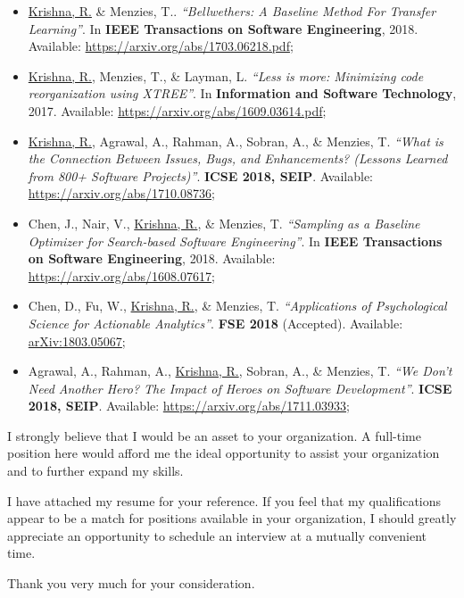 \documentclass[10pt,letterpaper,sans]{moderncv}         \moderncvstyle{casual}
\begin{document}
\begin{itemize}
    \item\small \underline{Krishna, R.} \& Menzies, T.. \textit{``Bellwethers: 
    A Baseline Method For Transfer Learning''}. In\textbf{ IEEE Transactions on 
    Software Engineering}, 2018. Available: \href{https://arxiv.org/abs/1703.06218.pdf}{https://arxiv.org/abs/1703.06218.pdf};\\[0.2cm]
    
    \item\small \underline{Krishna, R.}, Menzies, T., \& Layman, L. 
    \textit{``Less is more: Minimizing code reorganization using XTREE''}. In 
    \textbf{Information and Software Technology}, 2017. Available: \href{https://arxiv.org/abs/1609.03614.pdf}{https://arxiv.org/abs/1609.03614.pdf};\\[0.2cm]
    
    \item\small \underline{Krishna, R.}, Agrawal, A., Rahman, A., Sobran, A., 
    \& Menzies, T. \textit{``What is the Connection Between Issues, Bugs, and 
    Enhancements? (Lessons Learned from 800+ Software Projects)''}. 
    \textbf{ICSE 2018, SEIP}. Available: \href{https://arxiv.org/abs/1710.08736}{https://arxiv.org/abs/1710.08736};\\[0.2cm]
    
    \item\small Chen, J., Nair, V., \underline{Krishna, R.}, \& Menzies, T. 
    \textit{``Sampling as a Baseline Optimizer for Search-based Software
    Engineering''}. In \textbf{IEEE Transactions on Software Engineering}, 2018. Available: \href{https://arxiv.org/abs/1608.07617}{https://arxiv.org/abs/1608.07617};\\[0.2cm]

    \item\small Chen, D., Fu, W., \underline{Krishna, R.}, \& Menzies, T. \textit{``Applications of Psychological Science for Actionable Analytics''}. \textbf{FSE 2018} (Accepted). Available: \href{https://arxiv.org/abs/1803.05067}{arXiv:1803.05067};\\[0.2cm]

    \item\small Agrawal, A., Rahman, A., \underline{Krishna, R.}, Sobran, A., 
    \& Menzies, T. \textit{``We Don't Need Another Hero? The Impact of Heroes on Software Development''}. 
    \textbf{ ICSE 2018, SEIP}. Available: \href{https://arxiv.org/abs/1711.03933}{https://arxiv.org/abs/1711.03933};

\end{itemize}


I strongly believe that I would be an asset to your organization. A full-time position here would afford me the ideal opportunity to assist your organization and to further expand my skills.

I have attached my resume for your reference. If you feel that my qualifications appear to be a match for positions available in your organization, I should greatly appreciate an opportunity to schedule an interview at a mutually convenient time.

Thank you very much for your consideration.\\[1cm]


\makeletterclosing
\end{document}
